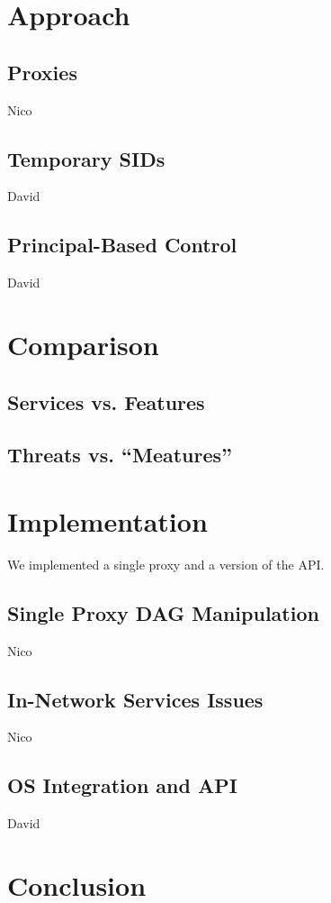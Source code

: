 \documentclass{article}
\begin{document}
\section{Approach}
\label{approach}
\subsection{Proxies}
Nico
\subsection{Temporary SIDs}
David
\subsection{Principal-Based Control}
David


\section{Comparison}
\label{comparison}
\subsection{Services vs. Features}
\subsection{Threats vs. ``Meatures''}


\section{Implementation}
\label{implementation}
We implemented a single proxy and a version of the API.
\subsection{Single Proxy DAG Manipulation}
Nico
\subsection{In-Network Services Issues}
Nico
\subsection{OS Integration and API}
David

\section{Conclusion}
\label{conclusion}

{}

\end{document}
